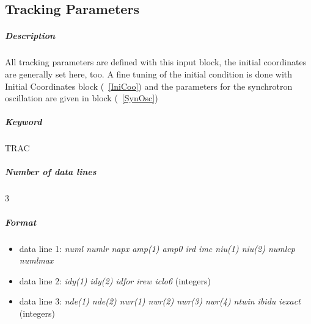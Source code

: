 \subsection{Tracking Parameters} \label{TraPar}

\subparagraph{Description} All tracking parameters are defined with
this input block, the initial coordinates are generally set here, too.
A fine tuning of the initial condition is done with Initial
Coordinates block (~\ref{IniCoo}) and the parameters for the
synchrotron oscillation are given in block (~\ref{SynOsc})

\subparagraph{Keyword} TRAC \subparagraph{Number of data lines} 3

\subparagraph{Format}
\begin{itemize}
\item data line 1: {\em numl numlr napx amp(1) amp0 ird imc niu(1) niu(2) numlcp numlmax}
\item data line 2: {\em idy(1) idy(2) idfor irew iclo6} \/(integers)
\item data line 3: {\em nde(1) nde(2) nwr(1) nwr(2) nwr(3) nwr(4) ntwin ibidu iexact} \/(integers)
\end{itemize}

